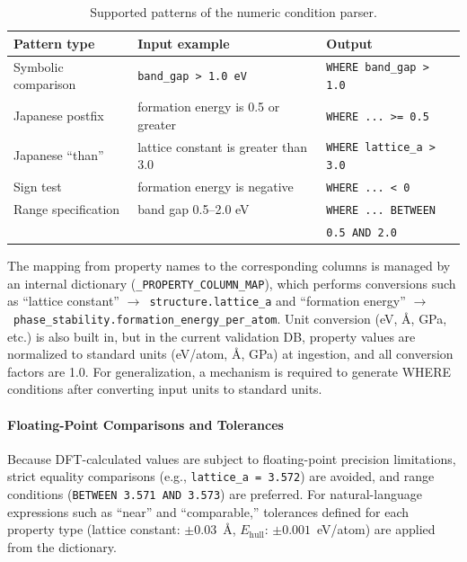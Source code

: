 \documentclass[5p,twocolumn]{elsarticle}
\begin{document}
\begin{table}[htbp]
  \centering
  \caption{Supported patterns of the numeric condition parser.}
  \label{tab:numeric_patterns}
  \scriptsize
  \begin{tabular}{lll}
    \toprule
    Pattern type & Input example & Output \\
    \midrule
    Symbolic comparison & \texttt{band\_gap > 1.0 eV} & \texttt{WHERE band\_gap > 1.0} \\
    Japanese postfix & formation energy is 0.5 or greater & \texttt{WHERE ... >= 0.5} \\
    Japanese ``than'' & lattice constant is greater than 3.0 & \texttt{WHERE lattice\_a > 3.0} \\
    Sign test & formation energy is negative & \texttt{WHERE ... < 0} \\
    Range specification & band gap 0.5--2.0 eV & \texttt{WHERE ... BETWEEN} \\
             &                       & \texttt{0.5 AND 2.0} \\
    \bottomrule
  \end{tabular}
\end{table}

The mapping from property names to the corresponding columns is managed by an internal dictionary
(\texttt{\_PROPERTY\_COLUMN\_MAP}),
which performs conversions such as
``lattice constant'' $\to$~\texttt{structure.lattice\_a} and
``formation energy'' $\to$~\texttt{phase\_stability.formation\_energy\_per\_atom}.
Unit conversion (eV, Å, GPa, etc.) is also built in, but in the current validation DB,
property values are normalized to standard units (eV/atom, \AA, GPa) at ingestion,
and all conversion factors are 1.0. For generalization, a mechanism is required
to generate WHERE conditions after converting input units to standard units.

\paragraph{Floating-Point Comparisons and Tolerances}
Because DFT-calculated values are subject to floating-point precision limitations,
strict equality comparisons (e.g., \texttt{lattice\_a = 3.572}) are avoided,
and range conditions (\texttt{BETWEEN 3.571 AND 3.573}) are preferred.
For natural-language expressions such as ``near'' and ``comparable,''
tolerances defined for each property type (lattice constant: $\pm 0.03$~\AA,
$E_\text{hull}$: $\pm 0.001$~eV/atom) are applied from the dictionary.
\end{document}
